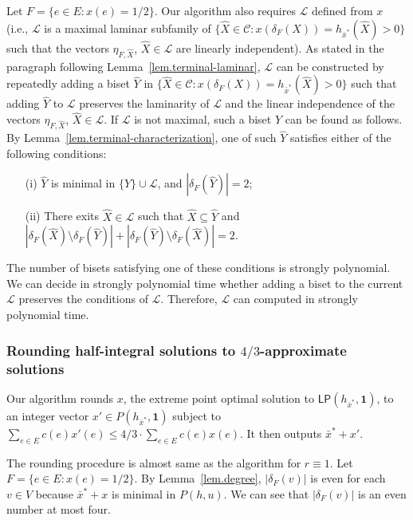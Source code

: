 \documentclass{article}
\newcommand{\Cfam}{\mathcal{C}}
\newcommand{\Lfam}{\mathcal{L}}
\newcommand{\allone}{\mathbf{1}}
\newcommand{\cut}{P}
\newcommand{\lp}{\mathsf{LP}}
\begin{document}
 Let $F=\{e \in E \colon x(e) =1/2\}$.
 Our algorithm also requires $\Lfam$ defined from $x$ (i.e., $\Lfam$ is
 a maximal laminar subfamily of $\{\hat{X} \in \Cfam \colon
 x(\delta_F(X))=h_{\bar{x}^*}(\hat{X})>0\}$
such that the vectors $\eta_{F,\hat{X}}$, $\hat{X} \in \Lfam$
 are linearly independent).
 As stated in the paragraph following Lemma~\ref{lem.terminal-laminar},
 $\Lfam$ can be constructed by
 repeatedly adding a
 biset $\hat{Y}$ in $\{\hat{X} \in \Cfam \colon x(\delta_F(X))=h_{\bar{x}^*}(\hat{X})>0\}$
 such that adding $\hat{Y}$ to $\Lfam$ preserves the laminarity of
 $\Lfam$
 and the linear independence of the vectors 
 $\eta_{F,\hat{X}}$, $\hat{X} \in \Lfam$.
 If $\Lfam$ is not maximal, such a biset $\hat{Y}$ 
 can be found as follows.
 By Lemma~\ref{lem.terminal-characterization}, 
 one of such $\hat{Y}$ satisfies either of the following conditions:
 \begin{itemize}
  \item[(i)]  $\hat{Y}$ is minimal in $\{\hat{Y}\} \cup \Lfam$, and $|\delta_F(\hat{Y})|=2$;
  \item[(ii)] There exits $\hat{X} \in \Lfam$ such that
	$\hat{X} \subseteq \hat{Y}$ and
	$|\delta_F(\hat{X})\setminus \delta_F(\hat{Y})|+|\delta_F(\hat{Y})\setminus \delta_F(\hat{X})|=2$.
 \end{itemize}
 The number of bisets satisfying one of these conditions is strongly
 polynomial.
We can decide in strongly polynomial time whether adding
a biset to the current $\Lfam$ preserves the conditions of $\Lfam$. 
Therefore, $\Lfam$ can computed in strongly polynomial time.



\subsubsection*{Rounding half-integral solutions to $4/3$-approximate solutions}
Our algorithm rounds $x$, the extreme point optimal solution
to $\lp(h_{\bar{x}^*},\allone)$,
to an integer vector $x' \in \cut(h_{\bar{x}^*},\allone)$
subject to $\sum_{e \in E}c(e)x'(e) \leq 4/3 \cdot \sum_{e \in E}c(e)x(e)$.
It then outputs $\bar{x}^* + x'$.

The rounding procedure
is almost same as the algorithm for $r\equiv 1$.
Let $F=\{e \in E \colon x(e)=1/2\}$.
By Lemma~\ref{lem.degree}, $|\delta_F(v)|$ is even for each $v \in V$ because
$\bar{x}^* + x$ is minimal in $\cut(h,u)$.
We can see that $|\delta_F(v)|$ is an even number at most four.
\end{document}
